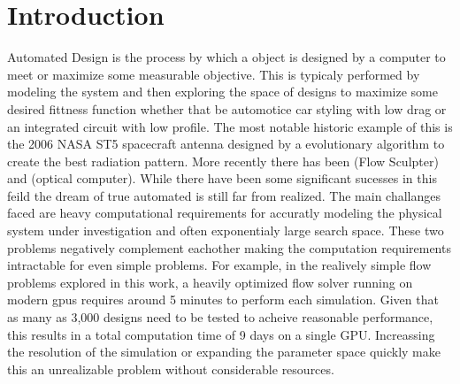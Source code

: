 \documentclass{article} %
\begin{document}
\begin{abstract}

\end{abstract}

\section{Introduction}

Automated Design is the process by which a object is designed by a computer to meet or maximize some measurable objective. This is typicaly performed by modeling the system and then exploring the space of designs to maximize some desired fittness function whether that be automotice car styling with low drag or an integrated circuit with low profile. The most notable historic example of this is the 2006 NASA ST5 spacecraft antenna designed by a evolutionary algorithm to create the best radiation pattern. More recently there has been (Flow Sculpter) and (optical computer). While there have been some significant sucesses in this feild the dream of true automated is still far from realized. The main challanges faced are heavy computational requirements for accuratly modeling the physical system under investigation and often exponentialy large search space. These two problems negatively complement eachother making the computation requirements intractable for even simple problems. For example, in the realively simple flow problems explored in this work, a heavily optimized flow solver running on modern gpus requires around 5 minutes to perform each simulation. Given that as many as 3,000 designs need to be tested to acheive reasonable performance, this results in a total computation time of 9 days on a single GPU. Increassing the resolution of the simulation or expanding the parameter space quickly make this an unrealizable problem without considerable resources.
\end{document}
